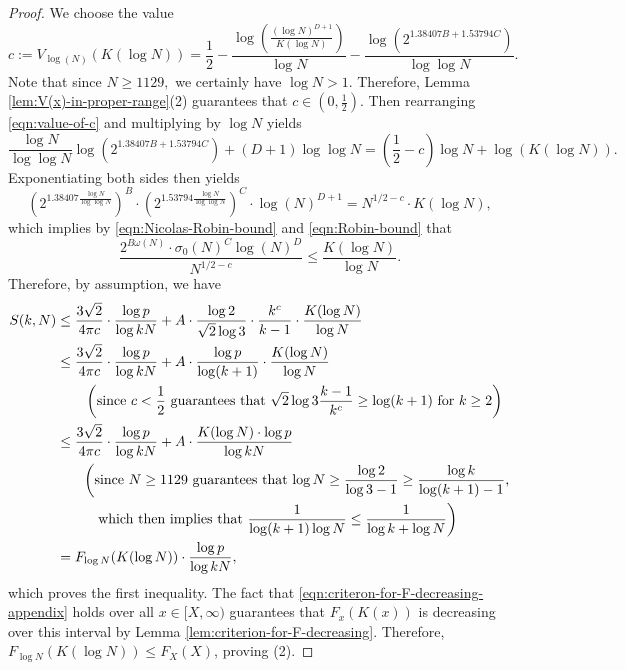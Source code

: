 \documentclass[11pt,letterpaper,reqno]{amsart}
\theoremstyle{definition}
\numberwithin{equation}{section}
\numberwithin{figure}{section}
\numberwithin{table}{section}
\begin{document}
\begin{proof}
    We choose the value
    \begin{equation}
        c := V_{\log(N)}(K(\log N)) = \frac{1}{2} - \frac{\log \left(\frac{\left( \log N  \right)^{D + 1}}{K(\log N)} \right)}{\log N} - \frac{\log \left( 2^{1.38407B +  1.53794C}  \right)}{\log \log N}. \label{eqn:value-of-c}
    \end{equation}
    Note that since $N \geq 1129,$ we certainly have $\log N > 1.$ Therefore, Lemma \ref{lem:V(x)-in-proper-range}(2) guarantees that $c \in \left(0, \frac{1}{2} \right).$ Then rearranging \eqref{eqn:value-of-c} and multiplying by $\log N$ yields
    $$\frac{\log N}{\log \log N} \log\left( 2^{1.38407B +  1.53794C}  \right) + (D + 1) \log\log N = \left( \frac{1}{2} - c \right)\log N + \log (K(\log N)).$$
    Exponentiating both sides then yields
    $$\left( 2^{1.38407 \frac{\log N}{\log \log N}} \right)^B \cdot \left( 2^{1.53794 \frac{\log N}{\log \log N}} \right)^C  \cdot \log(N)^{D +1} = N^{1/2 - c}\cdot K(\log N),$$
    which implies by \eqref{eqn:Nicolas-Robin-bound} and \eqref{eqn:Robin-bound} that
    $$\frac{2^{B\omega(N)} \cdot \sigma_0(N)^C  \log (N)^D}{N^{1/2 - c}} \leq \frac{K(\log N)}{\log N}.$$
    Therefore, by assumption, we have
    \begin{align*}
        S(k, N) &\leq \frac{3\sqrt{2}}{4\pi c} \cdot \frac{\log p}{ \log kN} +  A \cdot \frac{\log 2}{\sqrt{2} \log 3} \cdot \frac{k^c}{k - 1} \cdot \frac{K(\log N)}{\log N}\\
        &\leq \frac{3\sqrt{2}}{4\pi c} \cdot \frac{\log p}{ \log kN} +  A  \cdot \frac{\log p}{\log(k + 1)} \cdot \frac{K(\log N)}{\log N}\\
        & \qquad \left( \text{since $c < \frac{1}{2}$ guarantees that $ \sqrt{2} \log 3 \frac{k - 1}{k^c} \geq \log(k + 1)$ for $k \geq 2$} \right) \\
        &\leq \frac{3\sqrt{2}}{4\pi c} \cdot \frac{\log p}{ \log kN} +  A \cdot \frac{K(\log N) \cdot  \log p}{\log kN}\\
        & \qquad  \text{\bigg(since $N \geq 1129$ guarantees that $\log N \geq \frac{\log 2}{\log 3 - 1} \geq \frac{\log k}{\log(k + 1) - 1}$,}\\
        &\qquad\quad  \text{which then implies that $\frac{1}{\log(k + 1) \log N} \leq \frac{1}{\log k + \log N}$\bigg)}\\
        &= F_{\log N} (K(\log N)) \cdot \frac{\log p}{ \log kN},
    \end{align*}
    which proves the first inequality. The fact that \eqref{eqn:criteron-for-F-decreasing-appendix} holds over all $x \in [X, \infty)$ guarantees that $F_x(K(x))$ is decreasing over this interval by Lemma \ref{lem:criterion-for-F-decreasing}. Therefore, $F_{\log N} (K(\log N)) \leq F_{X} (X)$, proving (2).
\end{proof}
\end{document}
